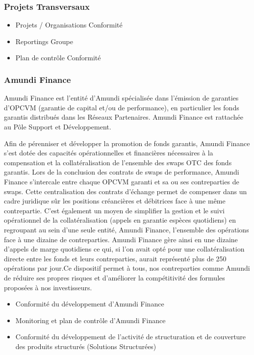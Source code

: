 \documentclass[12pt,a4paper]{report}
\begin{document}
\subsubsection{Projets Transversaux}
\begin{itemize}
\item Projets / Organisations Conformité
\item Reportings Groupe
\item Plan de contrôle Conformité
\end{itemize}
\subsubsection{Amundi Finance}
Amundi Finance est l’entité d’Amundi spécialisée dans l’émission de garanties d’OPCVM (garantie de capital et/ou de performance), en particulier les fonds garantis distribués dans les Réseaux Partenaires. Amundi Finance est rattachée au Pôle Support et Développement.

Afin de pérenniser et développer la promotion de fonds garantis, Amundi Finance s’est dotée des capacités opérationnelles et financières nécessaires à la compensation et la collatéralisation de l’ensemble des swaps OTC des fonds garantis.
\newline
Lors de la conclusion des contrats de swaps de performance, Amundi Finance s’intercale entre chaque OPCVM garanti et sa ou ses contreparties de swaps.
Cette centralisation des contrats d’échange permet de compenser dans un cadre juridique sûr les positions créancières et débitrices face à une même contrepartie. C’est également un moyen de simplifier la gestion et le suivi opérationnel de la collatéralisation (appels en garantie espèces quotidiens) en regroupant au sein d’une seule entité, Amundi Finance, l’ensemble des opérations face à une dizaine de contreparties. Amundi Finance gère ainsi en une dizaine d’appels de marge quotidiens ce qui, si l’on avait opté pour une collatéralisation directe entre les fonds et leurs contreparties, aurait représenté plus de 250 opérations par jour.\newline Ce dispositif permet à tous, nos contreparties comme Amundi de réduire ses propres risques et d’améliorer la compétitivité des formules proposées à nos investisseurs.
\begin{itemize}
\item Conformité du développement d’Amundi Finance
\item Monitoring et plan de contrôle d’Amundi Finance
\item Conformité du développement de l’activité de structuration et de couverture des produits structurés (Solutions Structurées)
\end{itemize}
\end{document}
